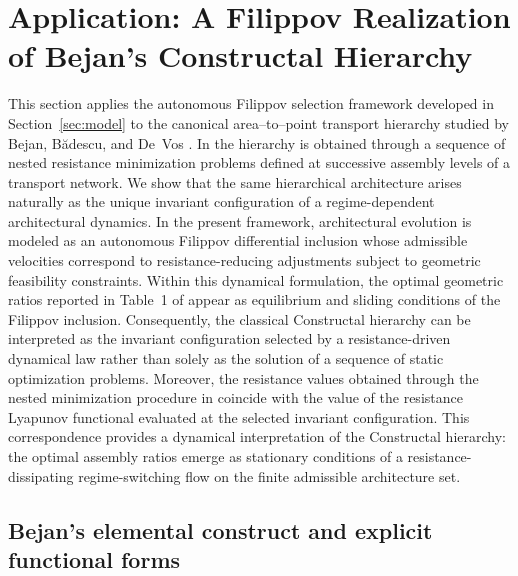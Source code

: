 \documentclass[12pt]{article}
\theoremstyle{plain}
\theoremstyle{definition}
\theoremstyle{remark}
\begin{document}
\section{Application: A Filippov Realization of Bejan’s Constructal Hierarchy}
\label{sec:application_filippov_bejan}

This section applies the autonomous Filippov selection framework
developed in Section~\ref{sec:model}
to the canonical area--to--point transport hierarchy studied by
Bejan, B\u{a}descu, and De~Vos \cite{BejanBadescuDeVos2000AE}.
In \cite{BejanBadescuDeVos2000AE} the hierarchy is obtained through
a sequence of nested resistance minimization problems defined at
successive assembly levels of a transport network.
We show that the same hierarchical architecture arises naturally as the
unique invariant configuration of a regime-dependent architectural
dynamics. In the present framework, architectural evolution is modeled
as an autonomous Filippov differential inclusion whose admissible
velocities correspond to resistance-reducing adjustments subject to
geometric feasibility constraints. Within this dynamical formulation, the optimal geometric ratios reported
in Table~1 of \cite{BejanBadescuDeVos2000AE} appear as equilibrium and
sliding conditions of the Filippov inclusion.
Consequently, the classical Constructal hierarchy can be interpreted as
the invariant configuration selected by a resistance-driven dynamical
law rather than solely as the solution of a sequence of static
optimization problems. Moreover, the resistance values obtained through the nested
minimization procedure in \cite{BejanBadescuDeVos2000AE} coincide with
the value of the resistance Lyapunov functional evaluated at the
selected invariant configuration.
This correspondence provides a dynamical interpretation of the
Constructal hierarchy: the optimal assembly ratios emerge as stationary
conditions of a resistance-dissipating regime-switching flow on the
finite admissible architecture set.



\subsection{Bejan’s elemental construct and explicit functional forms}
\label{subsec:bejan_elemental_functional_forms}
\end{document}
